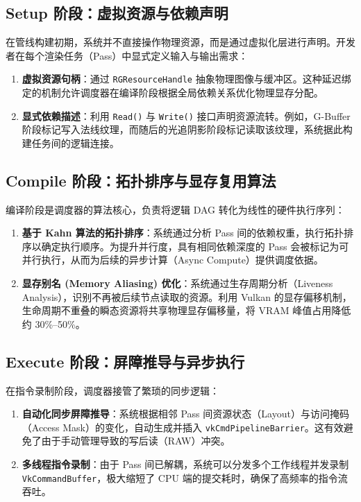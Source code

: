 \subsection{Setup 阶段：虚拟资源与依赖声明}
在管线构建初期，系统并不直接操作物理资源，而是通过虚拟化层进行声明。开发者在每个渲染任务（Pass）中显式定义输入与输出需求：
\begin{enumerate}
    \item \textbf{虚拟资源句柄}：通过 \texttt{RGResourceHandle} 抽象物理图像与缓冲区。这种延迟绑定的机制允许调度器在编译阶段根据全局依赖关系优化物理显存分配。
    \item \textbf{显式依赖描述}：利用 \texttt{Read()} 与 \texttt{Write()} 接口声明资源流转。例如，G-Buffer 阶段标记写入法线纹理，而随后的光追阴影阶段标记读取该纹理，系统据此构建任务间的逻辑连接。
\end{enumerate}

\subsection{Compile 阶段：拓扑排序与显存复用算法}
编译阶段是调度器的算法核心，负责将逻辑 DAG 转化为线性的硬件执行序列：
\begin{enumerate}
    \item \textbf{基于 Kahn 算法的拓扑排序}：系统通过分析 Pass 间的依赖权重，执行拓扑排序以确定执行顺序。为提升并行度，具有相同依赖深度的 Pass 会被标记为可并行执行，从而为后续的异步计算（Async Compute）提供调度依据。
    \item \textbf{显存别名 (Memory Aliasing) 优化}：系统通过生存周期分析（Liveness Analysis），识别不再被后续节点读取的资源。利用 Vulkan 的显存偏移机制，生命周期不重叠的瞬态资源将共享物理显存偏移量，将 VRAM 峰值占用降低约 30\%--50\%。
\end{enumerate}

\subsection{Execute 阶段：屏障推导与异步执行}
在指令录制阶段，调度器接管了繁琐的同步逻辑：
\begin{enumerate}
    \item \textbf{自动化同步屏障推导}：系统根据相邻 Pass 间资源状态（Layout）与访问掩码（Access Mask）的变化，自动生成并插入 \texttt{vkCmdPipelineBarrier}。这有效避免了由于手动管理导致的写后读（RAW）冲突。
    \item \textbf{多线程指令录制}：由于 Pass 间已解耦，系统可以分发多个工作线程并发录制 \texttt{VkCommandBuffer}，极大缩短了 CPU 端的提交耗时，确保了高频率的指令流吞吐。
\end{enumerate}

